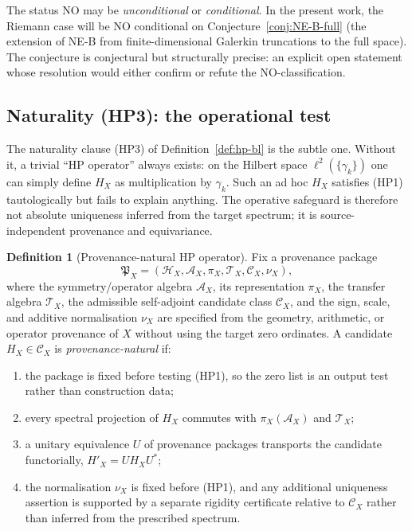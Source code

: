 \documentclass[11pt]{article}
\theoremstyle{definition}
\newtheorem{definition}[theorem]{Definition}
\theoremstyle{remark}
\begin{document}
The status $\mathrm{NO}$ may be \emph{unconditional} or
\emph{conditional}. In the present work, the Riemann case will be
$\mathrm{NO}$ conditional on Conjecture~\ref{conj:NE-B-full} (the
extension of NE-B from finite-dimensional Galerkin truncations to the
full space). The conjecture is conjectural but structurally precise: an explicit
open statement whose resolution would either confirm or refute the
NO-classification.

\subsection{Naturality (HP3): the operational test}

The naturality clause (HP3) of Definition~\ref{def:hp-bl} is the
subtle one. Without it, a trivial ``HP operator'' always exists: on
the Hilbert space $\ell^2(\{\gamma_k\})$ one can simply define $H_X$
as multiplication by $\gamma_k$. Such an ad hoc $H_X$ satisfies (HP1)
tautologically but fails to explain anything. The operative safeguard
is therefore not absolute uniqueness inferred from the target
spectrum; it is source-independent provenance and equivariance.

\begin{definition}[Provenance-natural HP operator]\label{def:natural-hp}
Fix a provenance package
\[
 \mathfrak{P}_X=(\mathcal{H}_X,\mathcal{A}_X,\pi_X,
 \mathcal{T}_X,\mathcal{C}_X,\nu_X),
\]
where the symmetry/operator algebra $\mathcal{A}_X$, its representation
$\pi_X$, the transfer algebra $\mathcal{T}_X$, the admissible
self-adjoint candidate class $\mathcal{C}_X$, and the sign, scale, and
additive normalisation $\nu_X$ are specified from the geometry,
arithmetic, or operator provenance of $X$ without using the target
zero ordinates. A candidate $H_X\in\mathcal{C}_X$ is
\emph{provenance-natural} if:
\begin{enumerate}
\item[(N1)] the package is fixed before testing (HP1), so the zero list
  is an output test rather than construction data;
\item[(N2)] every spectral projection of $H_X$ commutes with
  $\pi_X(\mathcal{A}_X)$ and $\mathcal{T}_X$;
\item[(N3)] a unitary equivalence $U$ of provenance packages transports
  the candidate functorially, $H'_X=UH_XU^*$;
\item[(N4)] the normalisation $\nu_X$ is fixed before (HP1), and any
  additional uniqueness assertion is supported by a separate rigidity
  certificate relative to $\mathcal{C}_X$ rather than inferred from
  the prescribed spectrum.
\end{enumerate}
\end{definition}
\end{document}
